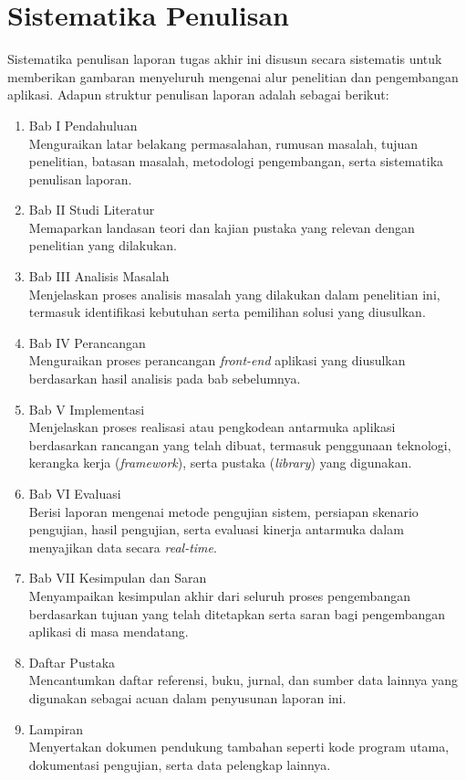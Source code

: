 \section{Sistematika Penulisan}
Sistematika penulisan laporan tugas akhir ini disusun secara sistematis untuk memberikan gambaran menyeluruh mengenai alur penelitian dan pengembangan aplikasi. Adapun struktur penulisan laporan adalah sebagai berikut:

\begin{enumerate}
    \item Bab I Pendahuluan\\
    Menguraikan latar belakang permasalahan, rumusan masalah, tujuan penelitian, batasan masalah, metodologi pengembangan, serta sistematika penulisan laporan.
    \item Bab II Studi Literatur\\
    Memaparkan landasan teori dan kajian pustaka yang relevan dengan penelitian yang dilakukan.
     \item Bab III Analisis Masalah\\
    Menjelaskan proses analisis masalah yang dilakukan dalam penelitian ini,
    termasuk identifikasi kebutuhan serta pemilihan solusi yang diusulkan.
    \item Bab IV Perancangan\\
    Menguraikan proses perancangan \textit{front-end} aplikasi yang diusulkan berdasarkan hasil analisis pada bab sebelumnya.
    \item Bab V Implementasi\\
    Menjelaskan proses realisasi atau pengkodean antarmuka aplikasi berdasarkan rancangan yang telah dibuat, termasuk penggunaan teknologi, kerangka kerja (\textit{framework}), serta pustaka (\textit{library}) yang digunakan.
    \item Bab VI Evaluasi\\
    Berisi laporan mengenai metode pengujian sistem, persiapan skenario pengujian, hasil pengujian, serta evaluasi kinerja antarmuka dalam menyajikan data secara \textit{real-time}.
    \item Bab VII Kesimpulan dan Saran\\
    Menyampaikan kesimpulan akhir dari seluruh proses pengembangan berdasarkan tujuan yang telah ditetapkan serta saran bagi pengembangan aplikasi di masa mendatang.
    \item Daftar Pustaka\\
    Mencantumkan daftar referensi, buku, jurnal, dan sumber data lainnya yang digunakan sebagai acuan dalam penyusunan laporan ini.
    \item Lampiran\\
    Menyertakan dokumen pendukung tambahan seperti kode program utama, dokumentasi pengujian, serta data pelengkap lainnya.
\end{enumerate}